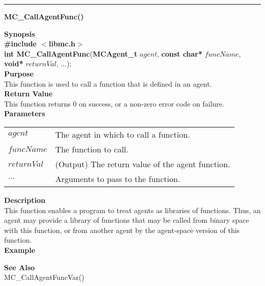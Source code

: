 \noindent
\vspace{5pt}
\rule{6.5in}{0.015in}
\noindent
{}
{\LARGE \bf MC\_CallAgentFunc()}\\

\noindent
{\bf Synopsis}\\
{\bf \#include $<$libmc.h$>$}\\
{\bf int MC\_CallAgentFunc}({\bf MCAgent\_t} $agent$, {\bf const char*} $funcName$, {\bf void*} $returnVal$, ...);\\

\noindent
{\bf Purpose}\\
This function is used to call a function that is defined in an agent. \\

\noindent
{\bf Return Value}\\
This function returns 0 on success, or a non-zero error code on failure. \\

\noindent
{\bf Parameters}
\vspace{-0.1in}
\begin{description}
\item
\begin{tabular}{ll}
$agent$ & The agent in which to call a function. \\
$funcName$ & The function to call. \\
$returnVal$ & (Output) The return value of the agent function. \\
$...$ &  Arguments to pass to the function. 
\end{tabular}
\end{description}

\noindent
{\bf Description}\\
This function enables a program to treat agents as libraries of functions. Thus, an agent
may provide a library of functions that may be called from binary space with this function, 
or from another agent by the agent-space version of this function. \\

\noindent
{\bf Example}\\
\noindent
{\footnotesize}

\noindent
{\bf See Also}\\
MC\_CallAgentFuncVar()

